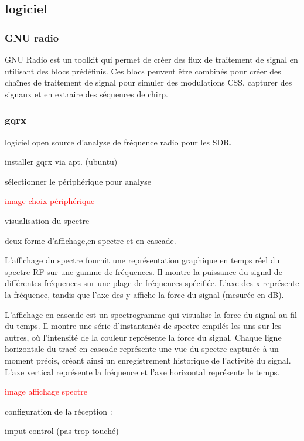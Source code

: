 \subsection{logiciel}

\subsubsection{GNU radio}

GNU Radio est un toolkit qui permet de créer des flux de traitement de signal en utilisant des blocs prédéfinis. Ces blocs peuvent être combinés pour créer des chaînes de traitement de signal pour simuler des modulations CSS, capturer des signaux et en extraire des séquences de chirp.

\subsubsection{gqrx}

logiciel open source d'analyse de fréquence radio pour les SDR.

installer gqrx via apt. (ubuntu)

sélectionner le périphérique pour analyse

\textcolor{red}{image choix périphérique}

visualisation du spectre

deux forme d'affichage,en spectre et en cascade.

L'affichage du spectre fournit une représentation graphique en temps réel du spectre RF sur une gamme de fréquences.
Il montre la puissance du signal de différentes fréquences sur une plage de fréquences spécifiée.
L'axe des x représente la fréquence, tandis que l'axe des y affiche la force du signal (mesurée en dB).

L'affichage en cascade est un spectrogramme qui visualise la force du signal au fil du temps.
Il montre une série d'instantanés de spectre empilés les uns sur les autres, où l'intensité de la couleur représente la force du signal.
Chaque ligne horizontale du tracé en cascade représente une vue du spectre capturée à un moment précis, créant ainsi un enregistrement historique de l'activité du signal.
L'axe vertical représente la fréquence et l'axe horizontal représente le temps.

\textcolor{red}{image affichage spectre}

configuration de la réception :

imput control (pas trop touché)

